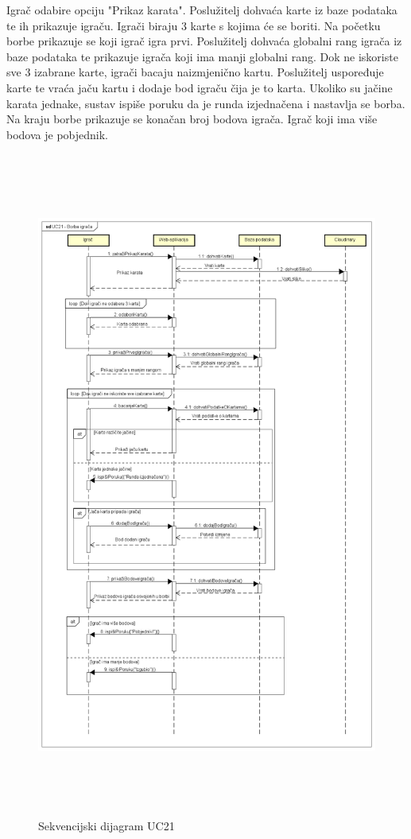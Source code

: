 					{Igrač odabire opciju "Prikaz karata". Poslužitelj dohvaća karte iz baze podataka te ih prikazuje igraču. Igrači biraju 3 karte s kojima će se boriti. Na početku borbe prikazuje se koji igrač igra prvi. Poslužitelj dohvaća globalni rang igrača iz baze podataka te prikazuje igrača koji ima manji globalni rang. Dok ne iskoriste sve 3 izabrane karte, igrači bacaju naizmjenično kartu. Poslužitelj uspoređuje karte te vraća jaču kartu i dodaje bod igraču čija je to karta. Ukoliko su jačine karata jednake, sustav ispiše poruku da je runda izjednačena i nastavlja se borba. Na kraju borbe prikazuje se konačan broj bodova igrača. Igrač koji ima više bodova je pobjednik. }\\
					
					\begin{figure}[H]
						\includegraphics[width=13cm, height=22cm]{dijagrami/sd_UC21}				
						\centering
						\caption{Sekvencijski dijagram UC21}
						\label{}
					\end{figure}
				\newpage
				

